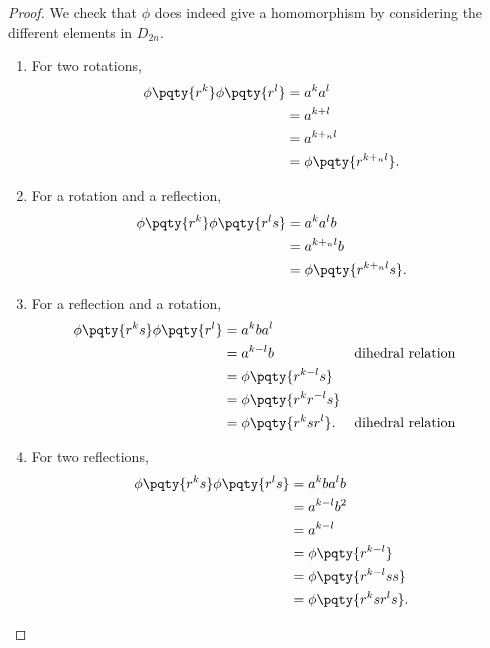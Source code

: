 \begin{proof}
    We check that \(\phi\) does indeed give a homomorphism by considering the different elements in \(D_{2n}\).

    \begin{enumerate}
        \item For two rotations,
        \begin{align*}
            \phi\pqty{r^k} \phi\pqty{r^l} &= a^k a^l \\
            &= a^{k + l} \\
            &= a^{k +_n l} \\
            &= \phi\pqty{r^{k +_n l}}.
        \end{align*}
        \item For a rotation and a reflection,
        \begin{align*}
            \phi\pqty{r^k} \phi\pqty{r^l s} &= a^k a^l b \\
            &= a^{k +_n l} b \\
            &= \phi\pqty{r^{k +_n l} s}.
        \end{align*}
        \item For a reflection and a rotation,
        \begin{align*}
            \phi\pqty{r^k s} \phi\pqty{r^l} &= a^k b a^l \\
            &= a^{k - l} b && \text{dihedral relation} \\
            &= \phi\pqty{r^{k - l} s} \\
            &= \phi\pqty{r^k r^{-l} s} \\
            &= \phi\pqty{r^k s r^l}. && \text{dihedral relation}
        \end{align*}
        \item For two reflections,
        \begin{align*}
            \phi\pqty{r^k s} \phi\pqty{r^l s} &= a^k b a^l b \\
            &= a^{k - l} b^2 \\
            &= a^{k - l} \\
            &= \phi\pqty{r^{k - l}} \\
            &= \phi\pqty{r^{k - l} s s} \\
            &= \phi\pqty{r^{k} s r^{l} s}.
        \end{align*}
    \end{enumerate}
\end{proof}

